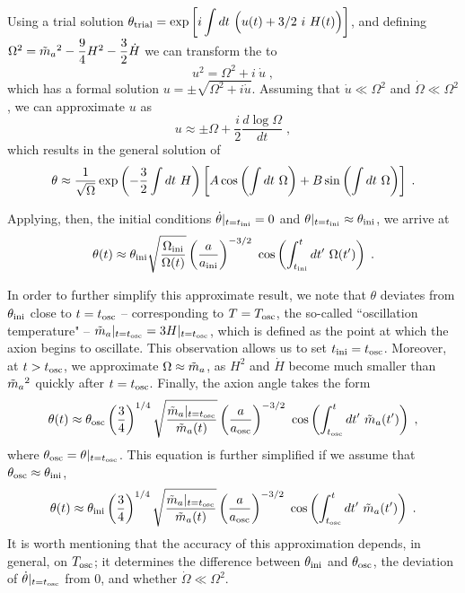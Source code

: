 \documentclass[11pt,a4paper]{article}
\begin{document}
Using a trial solution $\theta_{\rm trial} = \exp\left[  i \displaystyle \int d t \ \Big( u(t) +3/2 \ i \ H(t) \Big)  \right]$, and defining $\Omega^2 = \tilde m_{a}{}^2 - \dfrac{9}{4} H^2 -  \dfrac{3}{2} \dot H $ we can transform the  to 
%
\begin{equation}
	u^2 = \Omega^2 + i \ \dot u \; ,
	\label{eq:eom_of_u}
\end{equation}
%
which has a formal solution $u = \pm \sqrt{\Omega^2 + i \dot u}$. Assuming that $\dot u \ll \Omega^2$ and $\dot \Omega \ll \Omega^2$, we can approximate $u$ as
%
\begin{equation}
	u \approx \pm \Omega + \dfrac{i}{2} \dfrac{d \log \Omega}{d t} \;,
	\label{eq:u_approx}
\end{equation}
%
which results in the general solution of  
%
\begin{equation}
	\theta \approx \dfrac{1}{\sqrt{\Omega}} \exp\left( -\dfrac{3}{2} \int d t \ H \right) \left[  A \cos\left(  \int d t \ \Omega \right) +  B \sin\left(  \int d t \ \Omega \right)     \right] \;. 
	\label{eq:general_solution_eom_approx}
\end{equation}

Applying, then, the initial conditions $ \dot \theta |_{t=t_{\rm ini}{}} = 0$ and  $\theta|_{t=t_{\rm ini}{}} \approx \theta_{\rm ini}{}$, we arrive at 
%
\begin{equation}
\theta(t) \approx \theta_{\rm ini}{} \sqrt{ \dfrac{ \Omega_{\rm ini} }{\Omega (t)} } \left( \dfrac{a}{a_{\rm ini}{}} \right)^{-3/2} \  \cos\left(  \int_{t_{\rm ini}{}}^t d t^\prime  \ \Omega(t^\prime) \right)   \;.
\label{eq:solution_eom_approx} 
\end{equation}


In order to further simplify this approximate result, we note that $\theta$ deviates from $\theta_{\rm ini}{}$ close to $t=t_{\rm osc}{}$ -- corresponding to $T = T_{\rm osc}{}$, the so-called ``oscillation temperature" -- $\tilde m_{a}{}|_{t = t_{\rm osc}{}} = 3 H|_{t = t_{\rm osc}{}}$, which is defined as the point at which the axion begins to oscillate. 
%
This observation allows us to set $t_{\rm ini}{} = t_{\rm osc}{}$.  Moreover, at $t > t_{\rm osc}{}$, we approximate $\Omega \approx \tilde m_{a}{}$, as $H^2$ and $\dot H$ become much smaller than $\tilde m_{a}{}^2$ quickly after $t=t_{\rm osc}{}$. Finally, the axion angle takes the form
%
\begin{equation}
	\theta(t) \approx \theta_{\rm osc}{} \left( \dfrac{3}{4} \right)^{1/4} \sqrt{ \dfrac{ \tilde m_{a}{}|_{t=t_{\rm osc}{}} }{\tilde m_{a}{}  (t)} } \left( \dfrac{a}{a_{\rm osc}{}} \right)^{-3/2} \  \cos\left(  \int_{t_{\rm osc}{}}^t d t^\prime  \ \tilde m_{a}{}(t^\prime) \right)   \;,
	\label{eq:solution_eom_approx_theta_osc} 
\end{equation}
%
where $\theta_{\rm osc}{} = \theta|_{t=t_{\rm osc}{}}$. This equation is further simplified if we assume that $\theta_{\rm osc}{} \approx \theta_{\rm ini}{}$, \ie
%
\begin{equation}
	\theta(t) \approx \thetai \lrb{\dfrac{3}{4}}^{1/4} \sqrt{ \dfrac{ \maT|_{t=\tosc} }{\maT  (t)} } \lrb{\dfrac{a}{\aosc}}^{-3/2} \  \cos\lrb{ \int_{\tosc}^t d t^\prime  \ \maT(t^\prime)}   \;.
	\label{eq:solution_eom_approx_final} 
\end{equation}
%
It is worth mentioning that the accuracy of this approximation depends, in general, on $T_{\rm osc}{}$; it determines the difference between $\theta_{\rm ini}{}$ and $\theta_{\rm osc}{}$, the deviation of $\dot \theta|_{t=t_{\rm osc}{}}$ from $0$, and whether $\dot \Omega \ll \Omega^2$. 
\end{document}
